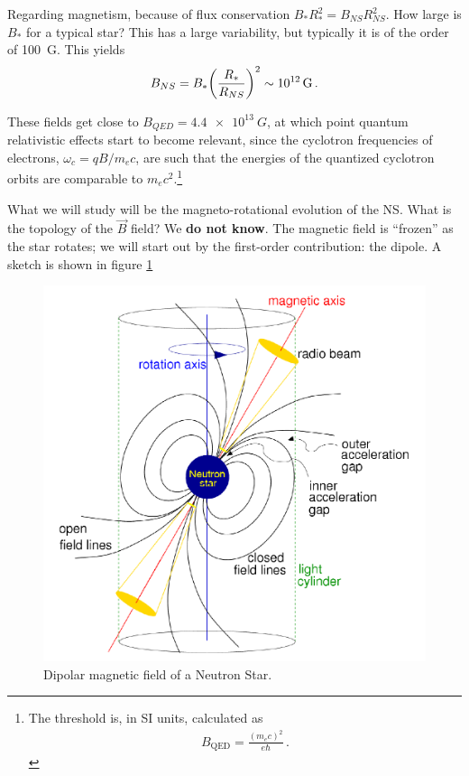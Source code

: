 \documentclass[main.tex]{subfiles}
\begin{document}
Regarding magnetism, because of flux conservation \(B_* R_*^2 = B_{NS} R_{NS}^2\). How large is \(B_*\) for a typical star?
This has a large variability, but typically it is of the order of \SI{100}{G}. 
This yields 
%
\begin{align}
B_{NS} = B_* \qty(\frac{R_*}{R_{NS}})^2 \sim \SI{e12}{G}
\,.
\end{align}

These fields get close to \(B_{QED} = \SI{4.4e13}{G}\), at which point quantum relativistic effects start to become relevant, since the cyclotron frequencies of electrons, \(\omega _c = q B / m_e c\), are such that the energies of the quantized cyclotron orbits are comparable to \(m_e c^2\).\footnote{The threshold is, in SI units, calculated as 
%
\begin{align}
B _{\text{QED}} = \frac{(m_ec)^2}{e \hbar}
\,.
\end{align}
}

What we will study will be the magneto-rotational evolution of the NS. 
What is the topology of the \(\vec{B}\) field? We \textbf{do not know}. 
The magnetic field is ``frozen'' as the star rotates; we will start out by the first-order contribution: the dipole. A sketch is shown in figure \ref{fig:dipole-field}

\begin{figure}[ht]
\centering
\includegraphics[width=.8\textwidth]{figures/dipole-field.png}
\caption{Dipolar magnetic field of a Neutron Star.}
\label{fig:dipole-field}
\end{figure}
\end{document}
